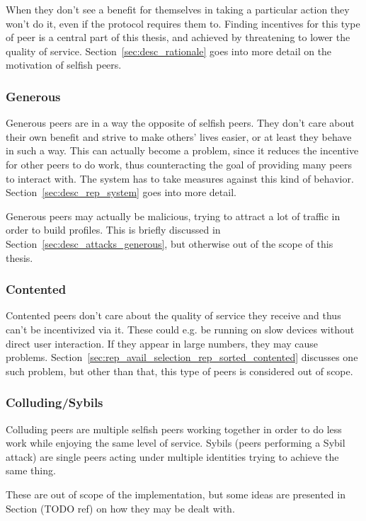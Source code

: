 When they don't see a benefit for themselves in taking a particular action they
won't do it, even if the protocol requires them to. Finding incentives for this
type of peer is a central part of this thesis, and achieved by threatening to
lower the quality of service. Section~\ref{sec:desc_rationale} goes into more
detail on the motivation of selfish peers.

\subsubsection{Generous}
\label{sec:desc_generous_peers}
Generous peers are in a way the opposite of selfish peers. They don't care about
their own benefit and strive to make others' lives easier, or at least they
behave in such a way. This can actually become a problem, since it reduces the
incentive for other peers to do work, thus counteracting the goal of providing
many peers to interact with. The system has to take measures against this kind
of behavior. Section~\ref{sec:desc_rep_system} goes into more detail.

Generous peers may actually be malicious, trying to attract a lot of traffic in
order to build profiles. This is briefly discussed in
Section~\ref{sec:desc_attacks_generous}, but otherwise out of the scope of this
thesis.

\subsubsection{Contented}
\label{sec:desc_contented_peers}
Contented peers don't care about the quality of service they receive and thus
can't be incentivized via it. These could e.g. be running on slow devices
without direct user interaction. If they appear in large numbers, they may cause
problems. Section~\ref{sec:rep_avail_selection_rep_sorted_contented} discusses
one such problem, but other than that, this type of peers is considered out of
scope.

\subsubsection{Colluding/Sybils}
Colluding peers are multiple selfish peers working together in order to do less
work while enjoying the same level of service. Sybils (peers performing a Sybil
attack) are single peers acting under multiple identities trying to achieve the
same thing.

These are out of scope of the implementation, but some ideas are presented in
Section (TODO ref) on how they may be dealt with.

